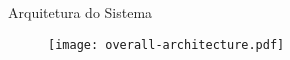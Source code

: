 \begin{frame}{Arquitetura do Sistema}
	\begin{figure}
		\centering
		\texttt{[image: overall-architecture.pdf]}
	\end{figure}
\end{frame}